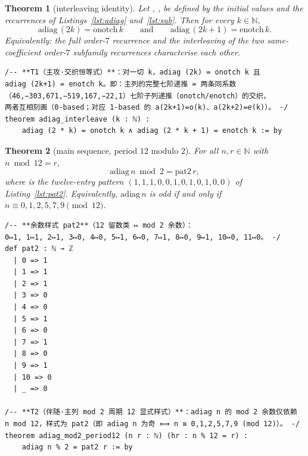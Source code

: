 \documentclass[11pt]{article}
\newtheorem{theorem}{Theorem}
\theoremstyle{definition}
\begin{document}
\begin{theorem}[interleaving identity]\label{thm:interleave}
Let , ,  be defined by the initial values
and the recurrences of Listings~\ref{lst:adiag} and~\ref{lst:sub}. Then for
every $k\in\mathbb{N}$,
\[
  \mathrm{adiag}\,(2k)=\mathrm{onotch}\,k
  \qquad\text{and}\qquad
  \mathrm{adiag}\,(2k+1)=\mathrm{enotch}\,k .
\]
Equivalently: the full order-$7$ recurrence and the interleaving of the two
same-coefficient order-$7$ subfamily recurrences characterise each other.
\end{theorem}

\begin{lstlisting}[caption={Theorem~\ref{thm:interleave}, verbatim from the
frozen statement file (lines 89--94, sha256 \texttt{16744fd3}); the listing
stops at the theorem's \texttt{:= by} line.},label={lst:t1stmt}]
/-- **T1（主攻·交织恒等式）**：对一切 k，adiag (2k) = onotch k 且
adiag (2k+1) = enotch k。即：主列的完整七阶递推 = 两条同系数
（46,−303,671,−519,167,−22,1）七阶子列递推（onotch/enotch）的交织，
两者互相刻画（0-based；对应 1-based 的 a(2k+1)=o(k)、a(2k+2)=e(k)）。 -/
theorem adiag_interleave (k : ℕ) :
    adiag (2 * k) = onotch k ∧ adiag (2 * k + 1) = enotch k := by
\end{lstlisting}

\begin{theorem}[main sequence, period $12$ modulo $2$]\label{thm:pat2}
For all $n,r\in\mathbb{N}$ with $n\bmod 12=r$,
\[
  \mathrm{adiag}\,n \bmod 2 = \mathrm{pat2}\,r,
\]
where  is the twelve-entry pattern
$(1,1,1,0,0,1,0,1,0,1,0,0)$ of Listing~\ref{lst:pat2}. Equivalently,
$\mathrm{adiag}\,n$ is odd if and only if
$n\equiv 0,1,2,5,7,9\pmod{12}$.
\end{theorem}

\begin{lstlisting}[caption={Pattern table \lean{pat2} and
Theorem~\ref{thm:pat2}, verbatim from the frozen statement file (lines
97--116, sha256 \texttt{16744fd3}); the listing stops at the theorem's
\texttt{:= by} line.},label={lst:pat2}]
/-- **余数样式 pat2**（12 留数类 ↦ mod 2 余数）：
0↦1, 1↦1, 2↦1, 3↦0, 4↦0, 5↦1, 6↦0, 7↦1, 8↦0, 9↦1, 10↦0, 11↦0。 -/
def pat2 : ℕ → ℤ
  | 0 => 1
  | 1 => 1
  | 2 => 1
  | 3 => 0
  | 4 => 0
  | 5 => 1
  | 6 => 0
  | 7 => 1
  | 8 => 0
  | 9 => 1
  | 10 => 0
  | _ => 0

/-- **T2（伴随·主列 mod 2 周期 12 显式样式）**：adiag n 的 mod 2 余数仅依赖
n mod 12，样式为 pat2（即 adiag n 为奇 ⟺ n ≡ 0,1,2,5,7,9 (mod 12)）。 -/
theorem adiag_mod2_period12 (n r : ℕ) (hr : n % 12 = r) :
    adiag n % 2 = pat2 r := by
\end{lstlisting}
\end{document}
